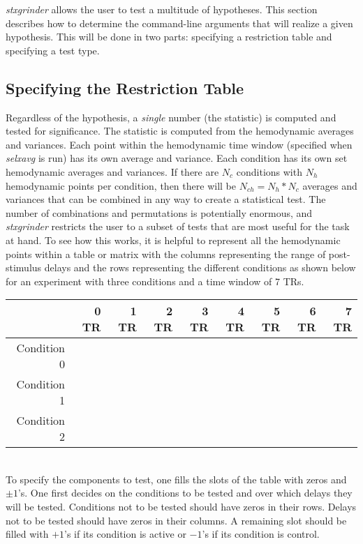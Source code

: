 \documentclass[10pt]{article}
\begin{document}
{\em stxgrinder} allows the user to test a multitude of hypotheses.
This section describes how to determine the command-line arguments
that will realize a given hypothesis.  This will be done in two
parts: specifying a restriction table and specifying a test type.

\subsection{Specifying the Restriction Table}

Regardless of the hypothesis, a {\em single} number (the statistic) is
computed and tested for significance.  The statistic is computed from
the hemodynamic averages and variances.  Each point within the
hemodynamic time window (specified when {\em selxavg} is run) has its
own average and variance.  Each condition has its own set hemodynamic
averages and variances.  If there are $N_c$ conditions with $N_h$
hemodynamic points per condition, then there will be $N_{ch} = N_h *
N_c$ averages and variances that can be combined in any way to create
a statistical test.  The number of combinations and permutations is
potentially enormous, and {\em stxgrinder} restricts the user to a
subset of tests that are most useful for the task at hand.  To see how
this works, it is helpful to represent all the hemodynamic points
within a table or matrix with the columns representing the range of
post-stimulus delays and the rows representing the different
conditions as shown below for an experiment with three conditions and
a time window of 7 TRs.\\

\begin{tabular}{|r||r|r|r|r|r|r|r|r|}\hline
& 0 TR & 1  TR & 2  TR & 3  TR & 4  TR & 5  TR & 6  TR & 7  TR\\ \hline \hline
Condition 0 &   &    &    &    &    &    &    &   \\ \hline
Condition 1 &   &    &    &    &    &    &    &   \\ \hline
Condition 2 &   &    &    &    &    &    &    &   \\ \hline
\end{tabular}\\

To specify the components to test, one fills the slots of the table
with zeros and $\pm 1$'s.  One first decides on the conditions to be
tested and over which delays they will be tested.  Conditions not to
be tested should have zeros in their rows.  Delays not to be tested
should have zeros in their columns.  A remaining slot should be
filled with $+1$'s if its condition is active or $-1$'s if its
condition is control.  
\end{document}
